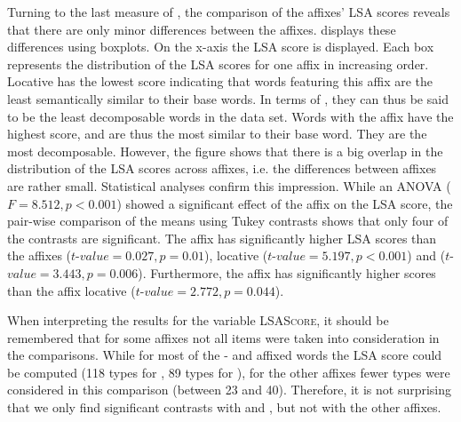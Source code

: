 Turning to the last measure of , the comparison of the affixes' LSA scores reveals that there are only minor differences between the affixes.  displays these differences using boxplots. On the x-axis the LSA score is displayed. Each box represents the distribution of the LSA scores for one affix in increasing order. Locative  has the lowest score indicating that words featuring this affix are the least semantically similar to their base words. In terms of , they can thus be said to be the least decomposable words in the data set. Words with the affix  have the highest score, and are thus the most similar to their base word. They are the most decomposable.
However, the figure shows that there is a big overlap in the distribution of the LSA scores across affixes, i.e. the differences between affixes are rather small. Statistical analyses confirm this impression.
While an ANOVA ($F=8.512, p< 0.001$) showed a significant effect of the affix on the LSA score, the pair-wise comparison of the means using Tukey contrasts shows  that only four of the contrasts are significant. The affix  has significantly higher LSA scores than the affixes  ($t$-$value=0.027, p=0.01$), locative  ($t$-$value=5.197, p< 0.001$) and   ($t$-$value=3.443, p=0.006$). Furthermore, the affix  has significantly higher scores than the  affix locative  ($t$-$value=2.772, p=0.044$). 



        When interpreting the results for the variable \textsc{LSAScore}, it should be remembered that for some affixes not all items were taken into consideration in the comparisons. While for most of the - and affixed words the LSA score could be computed (118 types for , 89 types for ), for the other affixes fewer types were considered in this comparison (between 23 and 40). Therefore, it is not surprising that we only find significant contrasts with  and , but not with the other affixes.  
        

